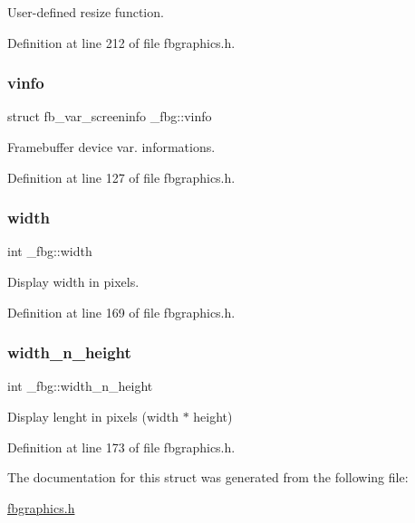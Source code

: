 User-\/defined resize function. 



Definition at line 212 of file fbgraphics.\+h.

\mbox{\label{struct__fbg_a22447f0d56680de6ff37587b44f7cf4b}} 
\subsubsection{\texorpdfstring{vinfo}{vinfo}}
{\footnotesize\ttfamily struct fb\+\_\+var\+\_\+screeninfo \+\_\+fbg\+::vinfo}



Framebuffer device var. informations. 



Definition at line 127 of file fbgraphics.\+h.

\mbox{\label{struct__fbg_a1d3c76643e4ee424f4d17e27991d5e2e}} 
\subsubsection{\texorpdfstring{width}{width}}
{\footnotesize\ttfamily int \+\_\+fbg\+::width}



Display width in pixels. 



Definition at line 169 of file fbgraphics.\+h.

\mbox{\label{struct__fbg_a1ab3f10e8c3483d7286db9850511d46d}} 
\subsubsection{\texorpdfstring{width\+\_\+n\+\_\+height}{width\_n\_height}}
{\footnotesize\ttfamily int \+\_\+fbg\+::width\+\_\+n\+\_\+height}



Display lenght in pixels (width $\ast$ height) 



Definition at line 173 of file fbgraphics.\+h.



The documentation for this struct was generated from the following file\+:\begin{DoxyCompactItemize}
\item 
\mbox{\hyperlink{fbgraphics_8h}{fbgraphics.\+h}}\end{DoxyCompactItemize}
